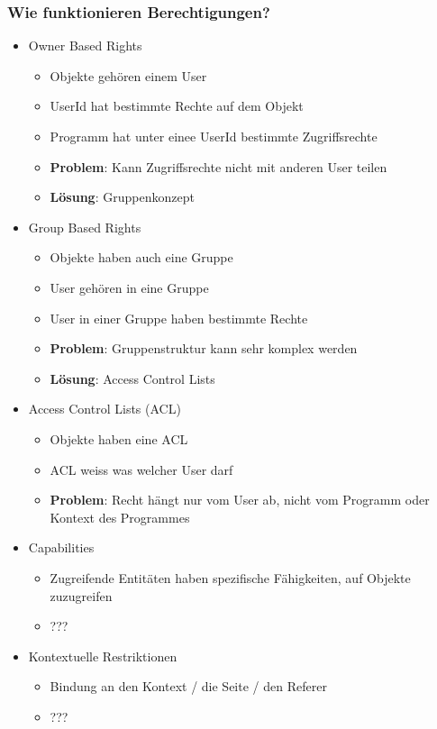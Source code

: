 \documentclass{article} %
\begin{document}
	\subsubsection{Wie funktionieren Berechtigungen?}
	\begin{itemize}
		\item Owner Based Rights
		\begin{itemize}
			\item Objekte gehören einem User
			\item UserId hat bestimmte Rechte auf dem Objekt
			\item Programm hat unter einee UserId bestimmte Zugriffsrechte
			\item \textbf{Problem}: Kann Zugriffsrechte nicht mit anderen User teilen
			\item \textbf{Lösung}: Gruppenkonzept
		\end{itemize}
		\item Group Based Rights
		\begin{itemize}
			\item Objekte haben auch eine Gruppe
			\item User gehören in eine Gruppe
			\item User in einer Gruppe haben bestimmte Rechte
			\item \textbf{Problem}: Gruppenstruktur kann sehr komplex werden
			\item \textbf{Lösung}: Access Control Lists
		\end{itemize}
		\item Access Control Lists (ACL)
		\begin{itemize}
			\item Objekte haben eine ACL
			\item ACL weiss was welcher User darf
			\item \textbf{Problem}: Recht hängt nur vom User ab, nicht vom Programm oder Kontext des Programmes	
		\end{itemize}
		\item Capabilities
		\begin{itemize}
			\item Zugreifende Entitäten haben spezifische Fähigkeiten, auf Objekte zuzugreifen
			\item ???
		\end{itemize}
		\item Kontextuelle Restriktionen
		\begin{itemize}
			\item Bindung an den Kontext / die Seite / den Referer
			\item ???
		\end{itemize}
	\end{itemize}
\end{document}
